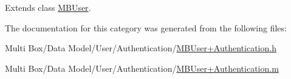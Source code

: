 Extends class \hyperlink{interface_m_b_user_a1e56d1480e455bac35e1a57a2db7fb47}{M\-B\-User}.



The documentation for this category was generated from the following files\-:\begin{DoxyCompactItemize}
\item 
Multi Box/\-Data Model/\-User/\-Authentication/\hyperlink{_m_b_user_09_authentication_8h}{M\-B\-User+\-Authentication.\-h}\item 
Multi Box/\-Data Model/\-User/\-Authentication/\hyperlink{_m_b_user_09_authentication_8m}{M\-B\-User+\-Authentication.\-m}\end{DoxyCompactItemize}
